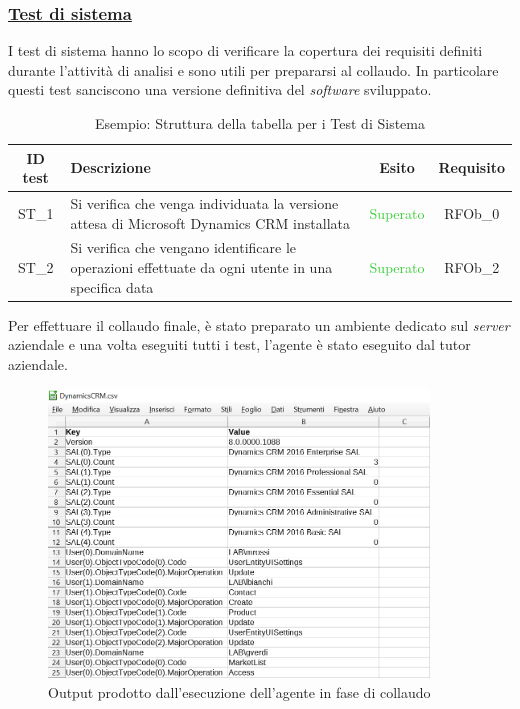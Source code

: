 \subsubsection{\underline{Test di sistema}}
I test di sistema hanno lo scopo di verificare la copertura dei requisiti definiti durante l’attività di analisi e sono utili per prepararsi al collaudo. In particolare questi test sanciscono una versione definitiva del \emph{software} sviluppato.
\begin{table}[H]
\begin{tabularx}{\textwidth}{|c|X|c|c|}
	\hline
	\rowcolor{aliceblue}
	{ID test} & {Descrizione}  & {Esito} & {Requisito} \\ \hline
	{ST\_1} & {Si verifica che venga individuata la versione attesa di Microsoft Dynamics CRM installata} & {\textcolor{limegreen}{Superato}} & {RFOb\_0} \\
	\hline
	{ST\_2} & {Si verifica che vengano identificare le operazioni effettuate da ogni utente in una specifica data}  & {\textcolor{limegreen}{Superato}} & {RFOb\_2} \\
	\hline
\end{tabularx}
    \caption {Esempio: Struttura della tabella per i Test di Sistema \label{fig:tableST}}	
\end{table}

Per effettuare il collaudo finale, è stato preparato un ambiente dedicato sul \emph{server} aziendale e una volta eseguiti tutti i test, l'agente è stato eseguito dal tutor aziendale.
\begin{figure}[H]
\centering
\captionsetup{justification=centering,margin=2cm}
\includegraphics[width=0.9\textwidth ]{figures/output.png}
\caption [Output prodotto dall'esecuzione dell'agente in fase di collaudo]{Output prodotto dall'esecuzione dell'agente in fase di collaudo \label{fig:outputcollaudo}}
\end{figure}
